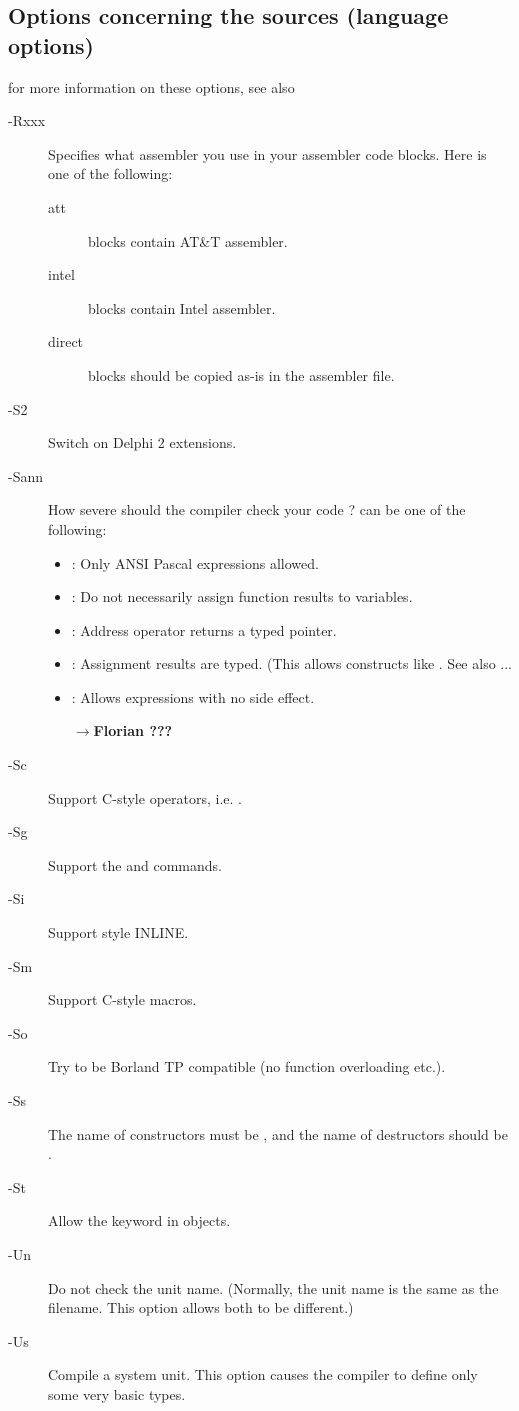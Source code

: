 \documentclass{report}
\newcommand{\remark}[1]{\par$\rightarrow$\textbf{#1}\par}
\newcommand{\olabel}[1]{\label{option:#1}}
\begin{document}
\subsection{Options concerning the sources (language options)}
for more information on these options, see also \progref
\begin{description}
\item [-Rxxx] \olabel{R} Specifies what assembler you use in your  assembler code
blocks. Here  is one of the following:
\begin{description}
\item [att\ ]  blocks contain AT\&T assembler.
\item [intel]  blocks contain Intel assembler.
\item [direct]  blocks should be copied as-is in the assembler
file.   
\end{description}
\item [-S2] \olabel{Stwo} Switch on Delphi 2 extensions.
\item [-Sann] \olabel{Sa} How severe should the compiler check your code ?
 can be one of the following:
\begin{itemize}
\item {} : Only ANSI Pascal expressions allowed.
\item {} : Do not necessarily assign function results to variables.
\item {} : Address operator  returns a typed pointer.
\item {} : Assignment results are typed. (This allows constructs like
. See also ...
\item {} : Allows expressions with no side effect. \remark{Florian ???}
\end{itemize}
\item [-Sc] \olabel{Sc} Support C-style operators, i.e. .
\item [-Sg] \olabel{Sg} Support the  and  commands.
\item [-Si] \olabel{Si} Support  style INLINE.
\item [-Sm] \olabel{Sm} Support C-style macros.
\item [-So] \olabel{So} Try to be Borland TP compatible (no function
overloading etc.).
\item [-Ss] \olabel{Ss} The name of constructors must be , and the
name of destructors should be .
\item [-St] \olabel{St} Allow the  keyword in objects.
\item [-Un] \olabel{Un} Do not check the unit name. (Normally, the unit name
is the same as the filename. This option allows both to be different.)
\item [-Us] \olabel{Us} Compile a system unit. This option causes the
compiler to define only some very basic types.
\end{description}
\end{document}
